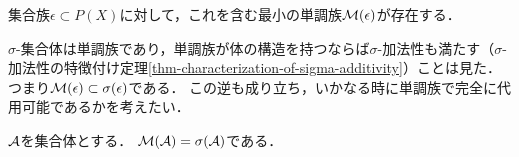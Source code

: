 \documentclass[uplatex, dvipdfmx]{jsreport}
\begin{document}
\begin{proposition}
    集合族$\epsilon\subset P(X)$に対して，これを含む最小の単調族$\mathcal{M}(\epsilon)$が存在する．
\end{proposition}

\begin{observation}
    $\sigma$-集合体は単調族であり，単調族が体の構造を持つならば$\sigma$-加法性も満たす（$\sigma$-加法性の特徴付け定理\ref{thm-characterization-of-sigma-additivity}）ことは見た．
    つまり$\mathcal{M}(\epsilon)\subset\sigma(\epsilon)$である．
    この逆も成り立ち，いかなる時に単調族で完全に代用可能であるかを考えたい．
\end{observation}

\begin{theorem}\label{thm-monotone-class-theorem}
    $\mathcal{A}$を集合体とする．
    $\mathcal{M}(\mathcal{A})=\sigma(\mathcal{A})$である．
\end{theorem}
\end{document}
